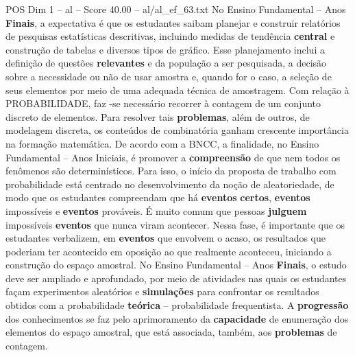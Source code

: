 \begin{textsample}{POS Dim 1 – al – Score 40.00 – al/al\_ef\_63.txt}
No Ensino Fundamental – Anos \textbf{Finais}, a expectativa é que os estudantes saibam planejar e construir relatórios de pesquisas estatísticas descritivas, incluindo medidas de tendência \textbf{central} e construção de tabelas e diversos tipos de gráfico.
Esse planejamento inclui a definição de questões \textbf{relevantes} e da população a ser pesquisada, a decisão sobre a necessidade ou não de usar amostra e, quando for o caso, a seleção de seus elementos por meio de uma adequada técnica de amostragem.
Com relação à PROBABILIDADE, faz -se necessário recorrer à contagem de um conjunto discreto de elementos.
Para resolver tais \textbf{problemas}, além de outros, de modelagem discreta, os conteúdos de combinatória ganham crescente importância na formação matemática.
De acordo com a BNCC, a finalidade, no Ensino Fundamental – Anos Iniciais, é promover a \textbf{compreensão} de que nem todos os fenômenos são determinísticos.
Para isso, o início da proposta de trabalho com probabilidade está centrado no desenvolvimento da noção de aleatoriedade, de modo que os estudantes compreendam que há \textbf{eventos} \textbf{certos}, \textbf{eventos} impossíveis e \textbf{eventos} prováveis.
É muito comum que pessoas \textbf{julguem} impossíveis \textbf{eventos} que nunca viram acontecer.
Nessa fase, é importante que os estudantes verbalizem, em \textbf{eventos} que envolvem o acaso, os resultados que poderiam ter acontecido em oposição ao que realmente aconteceu, iniciando a construção do espaço amostral.
No Ensino Fundamental – Anos \textbf{Finais}, o estudo deve ser ampliado e aprofundado, por meio de atividades nas quais os estudantes façam experimentos aleatórios e \textbf{simulações} para confrontar os resultados obtidos com a probabilidade \textbf{teórica} – probabilidade frequentista.
A \textbf{progressão} dos conhecimentos se faz pelo aprimoramento da \textbf{capacidade} de enumeração dos elementos do espaço amostral, que está associada, também, aos \textbf{problemas} de contagem.

\end{textsample}
